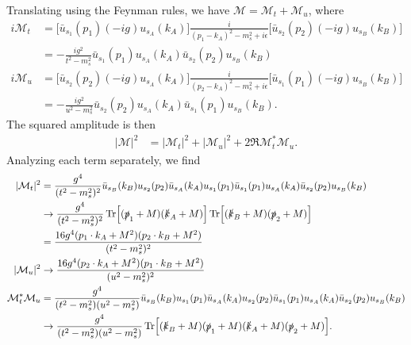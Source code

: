 {Translating using the Feynman rules, we have $\mathcal{M} = \mathcal{M}_{t} + \mathcal{M}_{u}$, where
\begin{align}
    i \mathcal{M}_{t} &= \big[ \bar{u}_{s_1}(p_1) (-i g) u_{s_{A}}(k_{A}) \Big] \frac{i}{(p_1 - k_{A})^2 - m_{s}^2 + i \epsilon} \big[ \bar{u}_{s_2}(p_2) (-i g) u_{s_{B}}(k_{B}) \big] \nonumber \\
    &= -\frac{i g^2}{t^2 - m_{s}^2} \bar{u}_{s_1}(p_1) u_{s_{A}}(k_{A}) \bar{u}_{s_2}(p_2) u_{s_{B}}(k_{B}) \\
%
    i \mathcal{M}_{u} &= \big[ \bar{u}_{s_2}(p_2) (-i g) u_{s_{A}}(k_{A}) \Big] \frac{i}{(p_2 - k_{A})^2 - m_{s}^2 + i \epsilon} \big[ \bar{u}_{s_1}(p_1) (-i g) u_{s_{B}}(k_{B}) \big] \nonumber \\
    &= -\frac{i g^2}{u^2 - m_{s}^2} \bar{u}_{s_2}(p_2) u_{s_{A}}(k_{A}) \bar{u}_{s_1}(p_1) u_{s_{B}}(k_{B})
.\end{align}
The squared amplitude is then
\begin{align}
    |\mathcal{M}|^2 &= |\mathcal{M}_{t}|^2 + |\mathcal{M}_{u}|^2 + 2 \Re{ \mathcal{M}_{t}^{*} \mathcal{M}_{u} }
.\end{align}
Analyzing each term separately, we find
\begin{align}
    |\mathcal{M}_{t}|^2 &= \frac{g^{4}}{(t^2 - m_{s}^2)^2} \bar{u}_{s_{B}}(k_{B}) u_{s_2}(p_2) \bar{u}_{s_{A}}(k_{A}) u_{s_1}(p_1) \bar{u}_{s_1}(p_1) u_{s_{A}}(k_{A}) \bar{u}_{s_2}(p_2) u_{s_{B}}(k_{B}) \nonumber \\
    &\rightarrow \frac{g^{4}}{(t^2 - m_{s}^2)^2} \Tr[ (\slashed{p}_{1} + M) (\slashed{k}_{A} + M) ] \Tr[ (\slashed{k}_{B} + M) (\slashed{p}_{2} + M) ] \nonumber \\
    &= \frac{16 g^{4} ( p_1 \cdot k_{A} + M^2 ) ( p_2 \cdot k_{B} + M^2 )}{(t^2 - m_{s}^2)^2} \\
%
    |\mathcal{M}_{u}|^2 &\rightarrow \frac{16 g^{4} ( p_2 \cdot k_{A} + M^2 ) ( p_1 \cdot k_{B} + M^2 )}{(u^2 - m_{s}^2)^2} \\
%
    \mathcal{M}_{t}^{*} \mathcal{M}_{u} &= \frac{g^{4}}{(t^2 - m_{s}^2) (u^2 - m_{s}^2)} \bar{u}_{s_{B}}(k_{B}) u_{s_1}(p_1) \bar{u}_{s_{A}}(k_{A}) u_{s_2}(p_2) \bar{u}_{s_1}(p_1) u_{s_{A}}(k_{A}) \bar{u}_{s_2}(p_2) u_{s_{B}}(k_{B}) \nonumber \\
    &\rightarrow \frac{g^{4}}{(t^2 - m_{s}^2)(u^2 - m_{s}^2)} \Tr[ ( \slashed{k}_{B} + M ) ( \slashed{p}_{1} + M ) ( \slashed{k}_{A} + M ) ( \slashed{p}_{2} + M ) ]
.\end{align}


}
    

